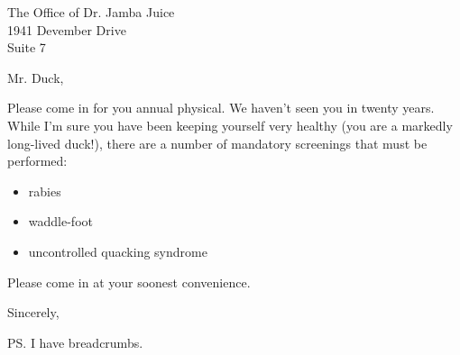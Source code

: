 \documentclass{letter}
\begin{document}
\begin{letter}{%
    The Office of Dr\@. Jamba Juice \\
    1941 Devember Drive             \\
    Suite 7}
  
\opening{Mr\@. Duck,}

Please come in for you annual physical.  We haven't seen you in twenty
years.  While I'm sure you have been keeping yourself very healthy
(you are a markedly long-lived duck!), there are a number of mandatory
screenings that must be performed:
\begin{itemize}
\item rabies
\item waddle-foot
\item uncontrolled quacking syndrome
\end{itemize}
Please come in at your soonest convenience.

\closing{Sincerely,}
\ps{I have breadcrumbs.}
\end{letter}
\end{document}
